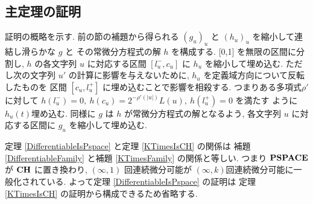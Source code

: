 \subsection{主定理の証明}
\label{subsection: proof of theorems}

 証明の概略を示す.
 前の節の補題から得られる $(g_u)_u$ と $(h_u)_u$ を縮小して連結し滑らかな $g$ と
 その常微分方程式の解 $h$ を構成する.
 [0,1] を無限の区間に分割し, $h$ の各文字列 $u$ に対応する区間
 $[l^-_u, c_u]$ に $h_u$ を縮小して埋め込む. 
 ただし次の文字列 $u'$ の計算に影響を与えないために,
 $h_u$ を定義域方向について反転したものを
 区間 $[c_u, l^+_u]$ に埋め込むことで影響を相殺する.
 つまりある多項式$\rho'$に対して
 $h(l^-_u) = 0,\ h(c_u) = 2^{-\rho'(|u|)} L(u),\ h(l^+_u) = 0$ を満たす
 ように $h_u(t)$埋め込む.
 同様に $g$ は $h$ が常微分方程式の解となるよう,
 各文字列 $u$ に対応する区間に $g_u$ を縮小して埋め込む.

 定理 \ref{DifferentiableIsPspace} と定理 \ref{KTimesIsCH} の関係は
 補題 \ref{DifferentiableFamily} と補題 \ref{KTimesFamily} の関係と等しい.
 つまり $\mathbf{PSPACE}$ が $\mathbf{CH}$ に置き換わり,
 $(\infty, 1)$ 回連続微分可能が $(\infty, k)$回連続微分可能に一般化されている.
 よって定理 \ref{DifferentiableIsPspace} の証明は
 定理 \ref{KTimesIsCH} の証明から構成できるため省略する.

